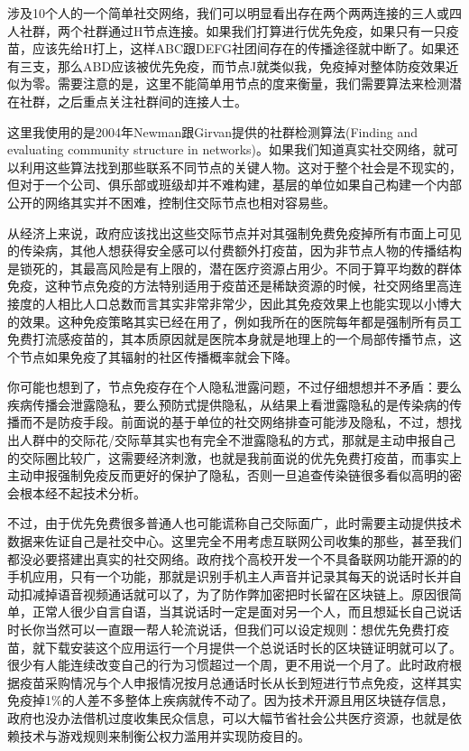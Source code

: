 \documentclass[
]{book}
\begin{document}
涉及10个人的一个简单社交网络，我们可以明显看出存在两个两两连接的三人或四人社群，两个社群通过H节点连接。如果我们打算进行优先免疫，如果只有一只疫苗，应该先给H打上，这样ABC跟DEFG社团间存在的传播途径就中断了。如果还有三支，那么ABD应该被优先免疫，而节点J就类似我，免疫掉对整体防疫效果近似为零。需要注意的是，这里不能简单用节点的度来衡量，我们需要算法来检测潜在社群，之后重点关注社群间的连接人士。

这里我使用的是2004年Newman跟Girvan提供的社群检测算法(Finding and evaluating community structure in networks)。如果我们知道真实社交网络，就可以利用这些算法找到那些联系不同节点的关键人物。这对于整个社会是不现实的，但对于一个公司、俱乐部或班级却并不难构建，基层的单位如果自己构建一个内部公开的网络其实并不困难，控制住交际节点也相对容易些。

从经济上来说，政府应该找出这些交际节点并对其强制免费免疫掉所有市面上可见的传染病，其他人想获得安全感可以付费额外打疫苗，因为非节点人物的传播结构是锁死的，其最高风险是有上限的，潜在医疗资源占用少。不同于算平均数的群体免疫，这种节点免疫的方法特别适用于疫苗还是稀缺资源的时候，社交网络里高连接度的人相比人口总数而言其实非常非常少，因此其免疫效果上也能实现以小博大的效果。这种免疫策略其实已经在用了，例如我所在的医院每年都是强制所有员工免费打流感疫苗的，其本质原因就是医院本身就是地理上的一个局部传播节点，这个节点如果免疫了其辐射的社区传播概率就会下降。

你可能也想到了，节点免疫存在个人隐私泄露问题，不过仔细想想并不矛盾：要么疾病传播会泄露隐私，要么预防式提供隐私，从结果上看泄露隐私的是传染病的传播而不是防疫手段。前面说的基于单位的社交网络排查可能涉及隐私，不过，想找出人群中的交际花/交际草其实也有完全不泄露隐私的方式，那就是主动申报自己的交际圈比较广，这需要经济刺激，也就是我前面说的优先免费打疫苗，而事实上主动申报强制免疫反而更好的保护了隐私，否则一旦追查传染链很多看似高明的密会根本经不起技术分析。

不过，由于优先免费很多普通人也可能谎称自己交际面广，此时需要主动提供技术数据来佐证自己是社交中心。这里完全不用考虑互联网公司收集的那些，甚至我们都没必要搭建出真实的社交网络。政府找个高校开发一个不具备联网功能开源的的手机应用，只有一个功能，那就是识别手机主人声音并记录其每天的说话时长并自动扣减掉语音视频通话就可以了，为了防作弊加密把时长留在区块链上。原因很简单，正常人很少自言自语，当其说话时一定是面对另一个人，而且想延长自己说话时长你当然可以一直跟一帮人轮流说话，但我们可以设定规则：想优先免费打疫苗，就下载安装这个应用运行一个月提供一个总说话时长的区块链证明就可以了。很少有人能连续改变自己的行为习惯超过一个周，更不用说一个月了。此时政府根据疫苗采购情况与个人申报情况按月总通话时长从长到短进行节点免疫，这样其实免疫掉1\%的人差不多整体上疾病就传不动了。因为技术开源且用区块链存信息，政府也没办法借机过度收集民众信息，可以大幅节省社会公共医疗资源，也就是依赖技术与游戏规则来制衡公权力滥用并实现防疫目的。
\end{document}
